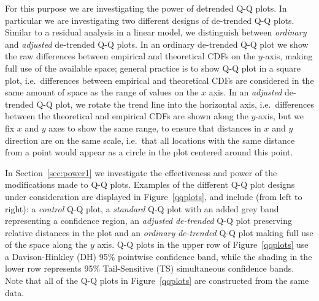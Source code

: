 \documentclass[12pt]{article}\usepackage[]{graphicx}\usepackage[]{color}
\newcommand{\hh}[1]{{\color{magenta} #1}}
\newcommand{\HH}[1]{{\color{orange} #1}}
\begin{document}
\hh{For this purpose we are investigating the power of detrended Q-Q plots. In particular }
 we are investigating two different designs of de-trended Q-Q plots. 
Similar to a residual analysis in a linear model, we distinguish between {\it ordinary} and {\it adjusted} de-trended Q-Q plots. In an ordinary de-trended Q-Q plot we show the raw differences between empirical and theoretical CDFs on the $y$-axis, making full use of the available space; general practice is to show Q-Q plot in a square plot, i.e.\ differences between empirical and theoretical CDFs are considered in  the same amount of space as the range of values on the $x$ axis. 
\HH{In an {\it adjusted} de-trended Q-Q plot, we rotate the trend line into the horizontal axis, i.e.\ differences between the theoretical and empirical CDFs are shown along the $y$-axis, but we fix $x$ and $y$ axes to show the same range, to ensure that distances in $x$ and $y$ direction are on the same scale, i.e.\ that all locations with the same distance from a point would appear as a circle in the plot centered around this point.  
}



In Section~\ref{sec:power1} we investigate the effectiveness and power of the modifications made to Q-Q plots.
Examples of the different Q-Q plot designs under consideration are displayed in Figure~\ref{qqplots}, and include (from left to right): a \emph{control} Q-Q plot, a \emph{standard} Q-Q plot with an added grey band representing a confidence region, an \emph{adjusted} \emph{de-trended} Q-Q plot preserving relative distances in the plot and an \emph{ordinary} \emph{de-trended} Q-Q plot making full use of the space along the $y$ axis.
Q-Q plots in the upper row of Figure~\ref{qqplots} use a Davison-Hinkley (DH) 95\% pointwise confidence band, while the shading in the lower row represents 95\% Tail-Sensitive (TS) simultaneous confidence bands.
Note that all of the Q-Q plots in Figure~\ref{qqplots} are constructed from the same data. 
\end{document}
